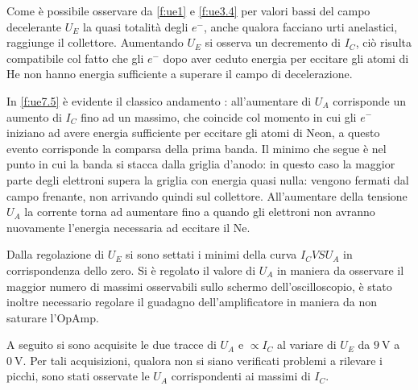 	Come è possibile osservare da \figurename{ \ref{f:ue1}} e \figurename{ \ref{f:ue3.4}}
	per valori bassi del campo decelerante $U_E$ la quasi totalità degli $e^{-}$, anche qualora facciano
	urti anelastici, raggiunge il collettore.
	Aumentando $U_E$ si osserva un decremento 
	di $I_C$, ciò risulta compatibile col fatto che gli $e^{-}$
	dopo aver ceduto energia per eccitare gli atomi di He
	non hanno energia sufficiente a superare il campo di decelerazione. 
	
In \figurename{ \ref{f:ue7.5}} è evidente il classico andamento  : all'aumentare di $U_A$ corrisponde un aumento di $I_C$ fino ad un massimo, che coincide col momento in cui gli $e^-$ iniziano ad avere energia sufficiente per eccitare gli atomi di Neon, a questo evento corrisponde la comparsa della prima banda. 
	Il minimo che segue è nel punto in cui la banda si stacca dalla griglia d'anodo: in questo caso la maggior parte degli elettroni supera la griglia con energia quasi nulla: vengono fermati dal campo frenante, non arrivando quindi sul collettore.
	All'aumentare della tensione $U_A$ la corrente torna ad aumentare fino a quando gli elettroni non avranno nuovamente l'energia necessaria ad eccitare il Ne.
	
	Dalla regolazione di $U_E$ si sono settati i minimi della curva 
	$I_C VS U_A$ in corrispondenza dello zero.
	Si è regolato il valore di $U_A$ in maniera da osservare il maggior
	numero di massimi osservabili sullo schermo dell'oscilloscopio,
	è stato inoltre necessario regolare il guadagno dell'amplificatore
	in maniera da non saturare l'OpAmp.
	
	A seguito si sono acquisite le due tracce di $U_A$ e $\propto I_C$ al variare di 
	$U_E$ da $\SI{9}{\volt}$ a $\SI{0}{\volt}$. Per  tali acquisizioni, qualora non si siano 
	verificati problemi a rilevare i picchi, sono stati 
	osservate le $U_A$ corrispondenti ai massimi di $I_C$.
	

